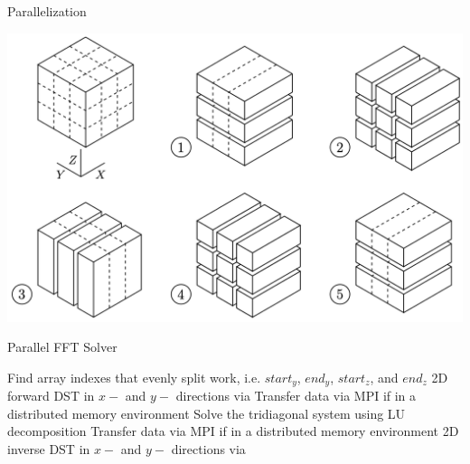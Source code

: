 \documentclass[handout]{beamer}
\begin{document}
\begin{frame}{Parallelization}
\begin{center}
\includegraphics[scale=.37]{images/mpi_image}
\end{center}
\end{frame}


\begin{frame}{Parallel FFT Solver}
\begin{algorithm}[H]
\caption{Parallel FFT Solver}\label{alg:general_parallel_fft}
\begin{algorithmic}[1]
\STATE Find array indexes that evenly split work, i.e. $start_y$, $end_y$, $start_z$, and $end_z$
\STATE 2D forward DST in $x-$ and $y-$ directions via \FFT
\ENDFOR
\STATE Transfer data via MPI if in a distributed memory environment
\STATE Solve the tridiagonal system using LU decomposition
\ENDFOR
\STATE Transfer data via MPI if in a distributed memory environment
\STATE 2D inverse DST in $x-$ and $y-$ directions via \FFT
\ENDFOR
\end{algorithmic}
\end{algorithm}
\end{frame}
\end{document}
